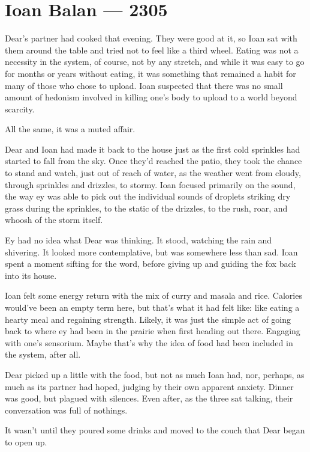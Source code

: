 \hypertarget{ioan-balan-2305}{%
\chapter*{Ioan Balan — 2305}\label{ioan-balan-2305}}

Dear's partner had cooked that evening. They were good at it, so Ioan sat with them around the table and tried not to feel like a third wheel. Eating was not a necessity in the system, of course, not by any stretch, and while it was easy to go for months or years without eating, it was something that remained a habit for many of those who chose to upload. Ioan suspected that there was no small amount of hedonism involved in killing one's body to upload to a world beyond scarcity.

All the same, it was a muted affair.

Dear and Ioan had made it back to the house just as the first cold sprinkles had started to fall from the sky. Once they'd reached the patio, they took the chance to stand and watch, just out of reach of water, as the weather went from cloudy, through sprinkles and drizzles, to stormy. Ioan focused primarily on the sound, the way ey was able to pick out the individual sounds of droplets striking dry grass during the sprinkles, to the static of the drizzles, to the rush, roar, and whoosh of the storm itself.

Ey had no idea what Dear was thinking. It stood, watching the rain and shivering. It looked more contemplative, but was somewhere less than sad. Ioan spent a moment sifting for the word, before giving up and guiding the fox back into its house.

Ioan felt some energy return with the mix of curry and masala and rice. Calories would've been an empty term here, but that's what it had felt like: like eating a hearty meal and regaining strength. Likely, it was just the simple act of going back to where ey had been in the prairie when first heading out there. Engaging with one's sensorium. Maybe that's why the idea of food had been included in the system, after all.

Dear picked up a little with the food, but not as much Ioan had, nor, perhaps, as much as its partner had hoped, judging by their own apparent anxiety. Dinner was good, but plagued with silences. Even after, as the three sat talking, their conversation was full of nothings.

It wasn't until they poured some drinks and moved to the couch that Dear began to open up.

